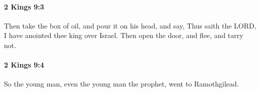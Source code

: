 		\paragraph{2 Kings 9:3} %
			\label{2KINGS-9-3}

			Then take the box of oil, and pour it on his head, and say, Thus saith the LORD, I have anointed thee king over Israel. Then open the door, and flee, and tarry not.


		\paragraph{2 Kings 9:4} %
			\label{2KINGS-9-4}

			So the young man, even the young man the prophet, went to Ramothgilead.


